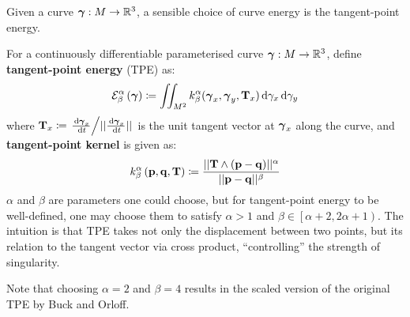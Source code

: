 \documentclass[../dissertation.tex]{subfiles}
\begin{document}
Given a curve $\boldsymbol{\gamma}:M \rightarrow \mathbb{R}^3$,
a sensible choice of curve energy is the tangent-point energy\cite{YSC2021}.
\begin{definition}
    For a continuously differentiable parameterised curve $\boldsymbol{\gamma}:M \rightarrow \mathbb{R}^3$, define \textbf{tangent-point energy} (TPE) as:
    \begin{equation}
        \mathcal{E}_{\beta}^{\alpha} \left( \boldsymbol{\gamma} \right) \coloneqq \iint_{M^2} k_{\beta}^{\alpha} (\boldsymbol{\gamma}_x, \boldsymbol{\gamma}_y, \mathbf{T}_x) \, \text{d} \gamma_x \, \text{d} \gamma_y 
        \label{equ: Tangent-Point Energy}
    \end{equation}
    where $\mathbf{T}_x \coloneqq \left. \frac{\, \text{d} \boldsymbol{\gamma}_x}{\, \text{d} t} \middle/ \lvert \lvert \frac{\, \text{d} \boldsymbol{\gamma}_x}{\, \text{d} t} \rvert \rvert \right. $ is the unit tangent vector at $\boldsymbol{\gamma}_x$ along the curve,
    and \textbf{tangent-point kernel} is given as:
    \begin{equation}
        k_{\beta}^{\alpha} \left( \mathbf{p}, \mathbf{q}, \mathbf{T} \right) \coloneqq \frac{\lvert \lvert \mathbf{T} \wedge \left( \mathbf{p} - \mathbf{q} \right) \rvert \rvert^{\alpha}}{\lvert \lvert \mathbf{p} - \mathbf{q} \rvert \rvert^{\beta}}
    \end{equation}
    $\alpha$ and $\beta$ are parameters one could choose, but for tangent-point energy to be well-defined,
    one may choose them to satisfy $\alpha >1$ and $\beta \in \left[ \alpha+2, 2\alpha + 1 \right)$.
    The intuition is that TPE takes not only the displacement between two points, but its relation to the tangent vector via cross product, ``controlling'' the strength of singularity.

    Note that choosing $\alpha = 2$ and $\beta = 4$ results in the scaled version of the original TPE by Buck and Orloff\cite{BO1995}.
\end{definition}
\end{document}
